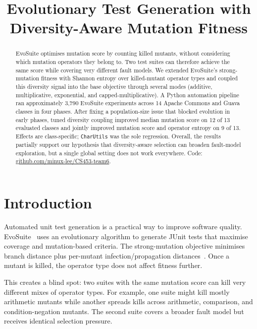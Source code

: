 \documentclass{IEEEtran}
\begin{document}
\title{Evolutionary Test Generation with Diversity-Aware Mutation Fitness}

\author{
}

\maketitle

\begin{abstract}
EvoSuite optimises mutation score by counting killed mutants, without considering which mutation operators they belong to.
Two test suites can therefore achieve the same score while covering very different fault models.
We extended EvoSuite's strong-mutation fitness with Shannon entropy over killed-mutant operator types and coupled this diversity signal into the base objective through several modes (additive, multiplicative, exponential, and capped-multiplicative).
A Python automation pipeline ran approximately 3{,}790 EvoSuite experiments across 14 Apache Commons and Guava classes in four phases.
After fixing a population-size issue that blocked evolution in early phases, tuned diversity coupling improved median mutation score on 12 of 13 evaluated classes and jointly improved mutation score and operator entropy on 9 of 13.
Effects are class-specific; \texttt{CharUtils} was the sole regression.
Overall, the results partially support our hypothesis that diversity-aware selection can broaden fault-model exploration, but a single global setting does not work everywhere.
Code: \href{https://github.com/minux-lee/CS453-team6}{github.com/minux-lee/CS453-team6}.
\end{abstract}

\section{Introduction}

Automated unit test generation is a practical way to improve software quality.
EvoSuite~\cite{fraser2011evosuite,fraser2014mutation} uses an evolutionary algorithm to generate JUnit tests that maximise coverage and mutation-based criteria.
The strong-mutation objective minimises branch distance plus per-mutant infection/propagation distances~\cite{fraser2014mutation}.
Once a mutant is killed, the operator type does not affect fitness further.

This creates a blind spot: two suites with the same mutation score can kill very different mixes of operator types.
For example, one suite might kill mostly arithmetic mutants while another spreads kills across arithmetic, comparison, and condition-negation mutants.
The second suite covers a broader fault model but receives identical selection pressure.
\end{document}

